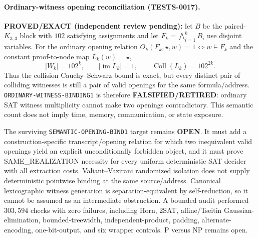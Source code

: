 \documentclass[11pt]{article}
\begin{document}
\paragraph{Ordinary-witness opening reconciliation (TESTS-0017).}
\textbf{PROVED/EXACT (independent review pending):} let \(B\) be the
paired-\(K_{3,3}\) block with \(102\) satisfying assignments and let
\(F_k=\bigwedge_{i=1}^k B_i\) use disjoint variables.  For the ordinary
opening relation \(O_k(F_k,\star,w)=1\iff w\models F_k\) and the constant
proof-to-node map \(L_k(w)=\star\),
\[
 |W_k|=102^k,\qquad |\operatorname{im}L_k|=1,\qquad
 \operatorname{Coll}(L_k)=102^{2k}.
\]
Thus the collision Cauchy--Schwarz bound is exact, but every distinct pair of
colliding witnesses is still a pair of valid openings for the same
formula/address.  \texttt{ORDINARY-WITNESS-BINDING1} is therefore
\textbf{FALSIFIED/RETIRED}: ordinary SAT witness multiplicity cannot make two
openings contradictory.  This semantic count does not imply time, memory,
communication, or state exposure.

The surviving \texttt{SEMANTIC-OPENING-BIND1} target remains \textbf{OPEN}.
It must add a construction-specific transcript/opening relation for which two
inequivalent valid openings yield an explicit unconditionally forbidden
object, and it must prove SAME\_REALIZATION necessity for every uniform
deterministic SAT decider with all extraction costs.  Valiant--Vazirani
randomized isolation does not supply deterministic pointwise binding at the
same source/address.  Canonical lexicographic witness generation is
separation-equivalent by self-reduction, so it cannot be assumed as an
intermediate obstruction.  A bounded audit performed \(303{,}594\) checks
with zero failures, including Horn, 2SAT, affine/Tseitin Gaussian-elimination,
bounded-treewidth, independent-product, padding, alternate-encoding,
one-bit-output, and six wrapper controls.  P versus NP remains open.
\end{document}
